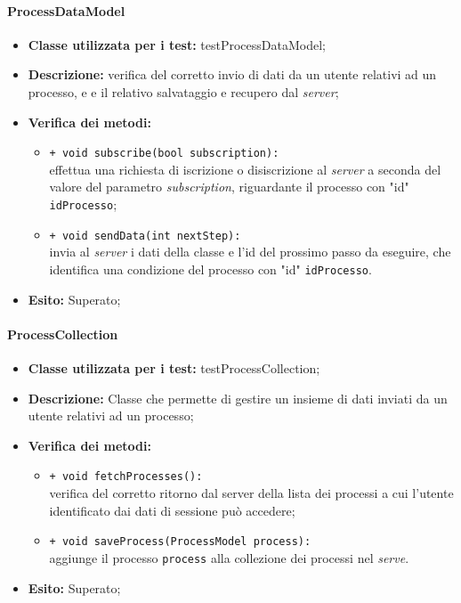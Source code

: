 \paragraph{ProcessDataModel}
\begin{flushleft}
\begin{itemize}
\item \textbf{Classe utilizzata per i test:} testProcessDataModel;
\item \textbf{Descrizione:} verifica del corretto invio di dati da un utente relativi ad un processo, e e il relativo salvataggio e recupero dal \textit{server};
\item \textbf{Verifica dei metodi:}
\begin{sloppypar}
\begin{itemize}
\item \texttt{+ void subscribe(bool subscription):}\\ effettua una richiesta di iscrizione o disiscrizione al \textit{server} a seconda del valore del parametro \textit{subscription}, riguardante il processo con "id" \texttt{idProcesso};
\item \texttt{+ void sendData(int nextStep):}\\ invia al \textit{server} i dati della classe e l'id del prossimo passo da eseguire, che identifica una condizione del processo con "id" \texttt{idProcesso}.
\end{itemize}
\end{sloppypar}
\item \textbf{Esito:} Superato;
\end{itemize}
\end{flushleft}


\paragraph{ProcessCollection}
\begin{flushleft}
\begin{itemize}
\item \textbf{Classe utilizzata per i test:} testProcessCollection;
\item \textbf{Descrizione:} Classe che permette di gestire un insieme di dati inviati da un utente relativi ad un processo;
\item \textbf{Verifica dei metodi:}
\begin{sloppypar}
\begin{itemize}
\item \texttt{+ void fetchProcesses():}\\ verifica del corretto ritorno dal server della lista dei processi a cui l'utente identificato dai dati di sessione può accedere;
\item \texttt{+ void saveProcess(ProcessModel process):}\\ aggiunge il processo \texttt{process} alla collezione dei processi nel \textit{serve}.
\end{itemize}
\end{sloppypar}
\item \textbf{Esito:} Superato;
\end{itemize}
\end{flushleft}

